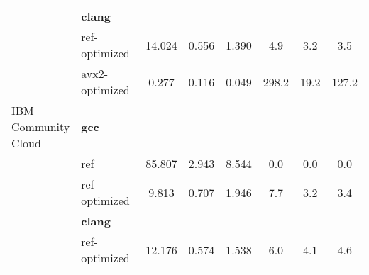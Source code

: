 \begin{table}
\begin{tabularx}{\linewidth}{l l c c c c c c}
          & \textbf{clang} & & & & & \\
          & ref-optimized & 14.024 & 0.556 & 1.390 & 4.9 & 3.2 & 3.5\\
          & avx2-optimized & 0.277 & 0.116 & 0.049 & 298.2 & 19.2 & 127.2\\
          \midrule
          \multirowcell{5}{IBM\\ Community\\ Cloud}
          & \textbf{gcc} & & & & & \\
          & ref & 85.807 & 2.943 & 8.544 & 0.0 & 0.0 & 0.0\\
          & ref-optimized & 9.813 & 0.707 & 1.946 & 7.7 & 3.2 & 3.4\\
          & \textbf{clang} & & & & & \\
          & ref-optimized & 12.176 & 0.574 & 1.538 & 6.0 & 4.1 & 4.6\\
        \bottomrule
    \end{tabularx}
\end{table}
